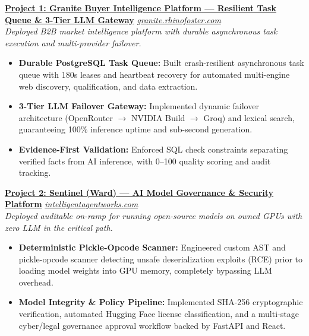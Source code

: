 \documentclass[a4paper,10pt]{article}
\begin{document}
\noindent
\href{https://granite.rhinofoster.com/}{\textbf{\color{projecttitle}Project 1: Granite Buyer Intelligence Platform — Resilient Task Queue \& 3-Tier LLM Gateway}} \hfill \href{https://granite.rhinofoster.com/}{\textit{\small granite.rhinofoster.com}} \\
\textit{\small Deployed B2B market intelligence platform with durable asynchronous task execution and multi-provider failover.}
\begin{itemize}
    \item \textbf{Durable PostgreSQL Task Queue:} Built crash-resilient asynchronous task queue with 180s leases and heartbeat recovery for automated multi-engine web discovery, qualification, and data extraction.
    \item \textbf{3-Tier LLM Failover Gateway:} Implemented dynamic failover architecture (OpenRouter $\rightarrow$ NVIDIA Build $\rightarrow$ Groq) and lexical search, guaranteeing 100\% inference uptime and sub-second generation.
    \item \textbf{Evidence-First Validation:} Enforced SQL check constraints separating verified facts from AI inference, with 0--100 quality scoring and audit tracking.
\end{itemize}

\vspace{6pt}

\noindent
\href{https://www.intelligentagentworks.com/}{\textbf{\color{projecttitle}Project 2: Sentinel (Ward) — AI Model Governance \& Security Platform}} \hfill \href{https://www.intelligentagentworks.com/}{\textit{\small intelligentagentworks.com}} \\
\textit{\small Deployed auditable on-ramp for running open-source models on owned GPUs with zero LLM in the critical path.}
\begin{itemize}
    \item \textbf{Deterministic Pickle-Opcode Scanner:} Engineered custom AST and pickle-opcode scanner detecting unsafe deserialization exploits (RCE) prior to loading model weights into GPU memory, completely bypassing LLM overhead.
    \item \textbf{Model Integrity \& Policy Pipeline:} Implemented SHA-256 cryptographic verification, automated Hugging Face license classification, and a multi-stage cyber/legal governance approval workflow backed by FastAPI and React.
\end{itemize}

\vspace{6pt}
\end{document}
